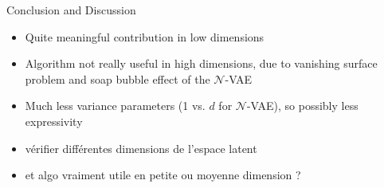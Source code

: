 \begin{frame}{Conclusion and Discussion}
  \begin{itemize}
    \item Quite meaningful contribution in low dimensions
    \item Algorithm not really useful in high dimensions, due to vanishing surface problem
    and soap bubble effect of the $\mathcal{N}$-VAE
    \item Much less variance parameters (1 vs. $d$ for $\mathcal{N}$-VAE), so possibly less expressivity
    \item vérifier différentes dimensions de l'espace latent 
    \item et algo vraiment utile en petite ou moyenne dimension ?
  \end{itemize}
  
  \end{frame}